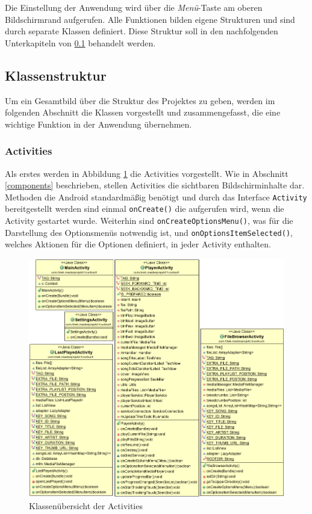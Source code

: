 Die Einstellung der Anwendung wird über die \textit{Menü}-Taste am oberen Bildschirmrand aufgerufen. Alle Funktionen bilden eigene Strukturen und sind durch separate Klassen definiert. Diese Struktur soll in den nachfolgenden Unterkapiteln von \ref{classes} behandelt werden.

\subsection{Klassenstruktur}
\label{classes}

Um ein Gesamtbild über die Struktur des Projektes zu geben, werden im folgenden Abschnitt die Klassen vorgestellt und zusammengefasst, die eine wichtige Funktion in der Anwendung übernehmen.

\subsubsection{Activities}

Als erstes werden in Abbildung \ref{cd_activities} die Activities vorgestellt. Wie in Abschnitt \ref{components} beschrieben, stellen Activities die sichtbaren Bildschirminhalte dar. Methoden die Android standardmäßig benötigt und durch das Interface \verb+Activity+ bereitgestellt werden sind einmal \verb+onCreate()+ die aufgerufen wird, wenn die Activity gestartet wurde. Weiterhin sind \verb+onCreateOptionsMenu()+, was für die Darstellung des Optionsmenüs notwendig ist, und \verb+onOptionsItemSelected()+, welches Aktionen für die Optionen definiert, in jeder Activity enthalten.

\begin{figure}[ht!]
\begin{center}
\includegraphics[scale=.5]{images/diagram}
\caption{Klassenübersicht der Activities}
\label{cd_activities}
\end{center}
\end{figure}

